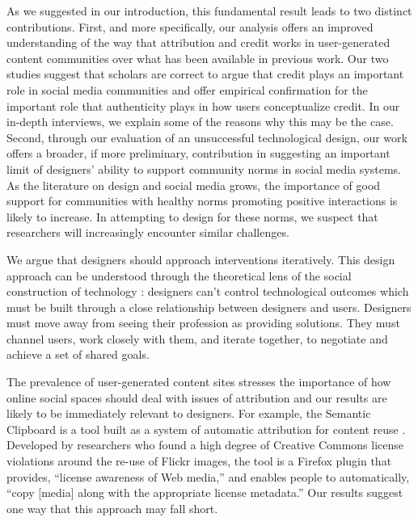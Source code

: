 As we suggested in our introduction, this fundamental result leads to
two distinct contributions. First, and more specifically, our analysis
offers an improved understanding of the way that attribution and
credit works in user-generated content communities over what has been
available in previous work. Our two studies suggest that scholars are
correct to argue that credit plays an important role in social media
communities and offer empirical confirmation for the important role
that authenticity plays in how users conceptualize credit. In our
in-depth interviews, we explain some of the reasons why this may be
the case. Second, through our evaluation of an unsuccessful
technological design, our work offers a broader, if more preliminary,
contribution in suggesting an important limit of designers' ability to
support community norms in social media systems. As the literature on
design and social media grows, the importance of good support for
communities with healthy norms promoting positive interactions is
likely to increase. In attempting to design for these norms, we
suspect that researchers will increasingly encounter similar
challenges.

We argue that designers should approach interventions iteratively.
This design approach can be understood through the
theoretical lens of the social construction of technology
\cite{pinch_social_1984}: designers can't control technological outcomes which
must be built through a close relationship between designers and users.
Designers must move away from seeing their profession as
providing solutions. They must channel users, work closely with them,
and iterate together, to negotiate and achieve a set of shared goals.

The prevalence of user-generated content sites stresses the importance
of how online social spaces should deal with issues of attribution and
our results are likely to be immediately relevant to 
designers. For example, the Semantic Clipboard is a tool built as a
system of automatic attribution for content reuse
\cite{seneviratne_policy-aware_2009}. Developed by researchers who
found a high degree of Creative Commons license violations around the
re-use of Flickr images, the tool is a Firefox plugin that provides,
``license awareness of Web media,'' and enables people to
automatically, ``copy [media] along with the appropriate license
metadata.'' Our results suggest one way that this approach
may fall short.

